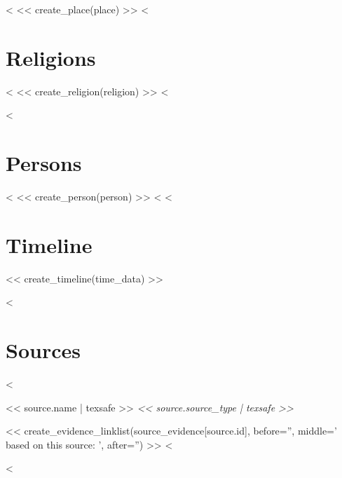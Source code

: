 \documentclass[fontsize=10pt,toc=chapterentrywithdots]{scrreprt}
\begin{document}
<%
<< create_place(place) >>
<%


\clearpage
\chapter{Religions}
\label{sec:religions}

<%
  << create_religion(religion) >>
<%


<%
\clearpage
\chapter{Persons}
\label{sec:persons}

<%
  << create_person(person) >>
<%
<%


\clearpage
\chapter{Timeline}
\label{sec:timeline}

<< create_timeline(time_data) >>


<%
\clearpage
\chapter{Sources}
\label{sec:sources}

\begin{description}
    <%
  \item[\textsc{<< source.short | texsafe >>}]
      \hypertarget{source<<source.id>>}{<< source.name | texsafe >>
        \emph{<< source.source_type | texsafe >>}}

      << create_evidence_linklist(source_evidence[source.id], before='', middle=' based on this source: ', after='') >>
    <%
\end{description}
<%
\end{document}
